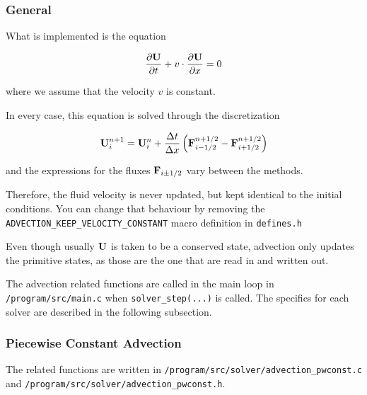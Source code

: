 \subsubsection{General}


What is implemented is the equation

\begin{equation}
    \frac{\partial \mathbf{U}}{\partial t} + v \cdot \frac{\partial \mathbf{U}}{\partial x} = 0
\end{equation}


where we assume that the velocity $v$ is constant.

In every case, this equation is solved through the discretization

\begin{equation}
	\mathbf{U}_i^{n+1} = \mathbf{U}_i^n + \frac{\Delta t}{\Delta x} \left( \mathbf{F}_{i - 1/2}^{n+1/2} - \mathbf{F}_{i + 1/2}^{n+1/2} \right) \label{eq:advection-discretized}
\end{equation}

and the expressions for the fluxes $\mathbf{F}_{i\pm1/2}$ vary between the methods.
 
Therefore, the fluid velocity is never updated, but kept identical to the initial conditions.
You can change that behaviour by removing the \verb|ADVECTION_KEEP_VELOCITY_CONSTANT| macro definition in \verb|defines.h|

Even though usually $\mathbf{U}$ is taken to be a conserved state, advection only updates the primitive states, as those are the one that are read in and written out.



The advection related functions are called in the main loop in \texttt{/program/src/main.c} when \verb|solver_step(...)| is called.
The specifics for each solver are described in the following subsection.







\subsubsection{Piecewise Constant Advection}


The related functions are written in \verb|/program/src/solver/advection_pwconst.c| and \verb|/program/src/solver/advection_pwconst.h|.


